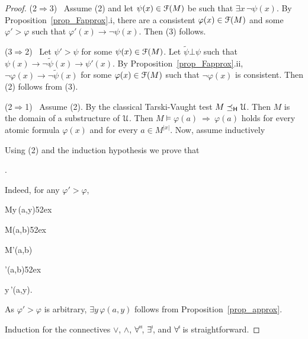 \documentclass{amsproc}
\begin{document}
{\begin{proof}
  (2$\Rightarrow$3) \ 
  Assume (2) and let $\psi(x)\in{\EuScript F}(M)$ be such that $\exists x\,\neg\psi(x)$.
  By Proposition~\ref{prop_Fapprox}.i, there are a consistent $\varphi(x)\in{\EuScript F}(M)$ and some $\varphi'>\varphi$ such that $\varphi'(x)\rightarrow\neg\psi(x)$.
  Then (3) follows.

  (3$\Rightarrow$2) \ 
  Let $\psi'>\psi$ for some $\psi(x)\in{\EuScript F}(M)$.
  Let $\tilde{\psi}\bot\psi$ such that $\psi(x)\rightarrow\neg\tilde{\psi}(x)\rightarrow\psi'(x)$.
  By Proposition~\ref{prop_Fapprox}.ii, $\neg\varphi(x)\rightarrow\neg\tilde{\psi}(x)$ for some $\varphi(x)\in{\EuScript F}(M)$ such that $\neg\varphi(x)$ is consistent.
  Then (2) follows from (3).
  
  (2$\Rightarrow$1) \ 
  Assume (2).
  By the classical Tarski-Vaught test $M\preceq_{\sf H}{\EuScript U}$.
  Then $M$ is the domain of a substructure of ${\EuScript U}$.
  Then $M\models\varphi(a)\ \Rightarrow\ \varphi(a)$ holds for every atomic formula $\varphi(x)$ and for every $a\in M^{|x|}$.
  Now, assume inductively
  
  \ceq{\hfill M\models\varphi(a,b)}{\Rightarrow}{\varphi(a,b).}

  Using (2) and the induction hypothesis we prove that

  .

  Indeed, for any $\varphi'>\varphi$,

  {\Rightarrow}{M\models\exists y\,\psi(a,y)}\hfill{}\kern52ex%
  
  \ceq{}
  {\Rightarrow}
  {M\models\psi(a,b)}\hfill{}\kern52ex
  
  \ceq{}
  {\Rightarrow}
  {M\models\varphi'(a,b)}
  
  \ceq{}
  {\Rightarrow}
  {\varphi'(a,b)}\hfill{}\kern52ex

  \ceq{}
  {\Rightarrow}
  {\exists y\,\varphi'(a,y).}

  As $\varphi'>\varphi$ is arbitrary, $\exists y\,\varphi(a,y)$ follows from Proposition~\ref{prop_approx}.

  Induction for the connectives $\vee$, $\wedge$, $\forall\raisebox{1.1ex}{\scaleto{\sf H}{.8ex}\kern-.2ex}$, $\exists\raisebox{1.1ex}{\scaleto{\sf I}{.8ex}\kern-.2ex}$, and $\forall\raisebox{1.1ex}{\scaleto{\sf I}{.8ex}\kern-.2ex}$ is straightforward.


\end{proof}}
\end{document}
